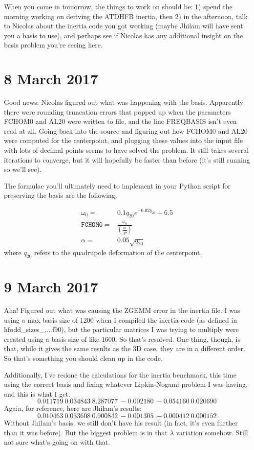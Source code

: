 \documentclass[]{report}
\begin{document}
When you come in tomorrow, the things to work on should be: 1) spend the morning working on deriving the ATDHFB inertia, then 2) in the afternoon, talk to Nicolas about the inertia code you got working (maybe Jhilam will have sent you a basis to use), and perhaps see if Nicolas has any additional insight on the basis problem you're seeing here.

\section*{8 March 2017}
Good news: Nicolas figured out what was happening with the basis. Apparently there were rounding truncation errors that popped up when the parameters FCHOM0 and AL20 were written to file, and the line FREQBASIS isn't even read at all. Going back into the source and figuring out how FCHOM0 and AL20 were computed for the centerpoint, and plugging these values into the input file with lots of decimal points seems to have solved the problem. It still takes several iterations to converge, but it will hopefully be faster than before (it's still running so we'll see).

The formulae you'll ultimately need to implement in your Python script for preserving the basis are the following:

\begin{eqnarray}
\omega_0        =& 0.1q_{20}e^{-0.02q_{20}}+6.5 \\
\mathtt{FCHOM0} =& \frac{\omega_0}{\left(\frac{41}{A^\frac{1}{3}}\right)} \\
\alpha          =& 0.05\sqrt{q_{20}}
\end{eqnarray}
\noindent where $q_{20}$ refers to the quadrupole deformation of the centerpoint.

\section*{9 March 2017}
Aha! Figured out what was causing the ZGEMM error in the inertia file. I was using a max basis size of 1200 when I compiled the inertia code (as defined in hfodd\_sizes\_....f90), but the particular matrices I was trying to multiply were created using a basis size of like 1600. So that's resolved. One thing, though, is that, while it gives the same results as the 3D case, they are in a different order. So that's something you should clean up in the code. 

Additionally, I've redone the calculations for the inertia benchmark, this time using the correct basis and fixing whatever Lipkin-Nogami problem I was having, and this is what I get:
\begin{equation}
    0.011719\    0.034843\    8.287077\   -0.002180\   -0.054160\    0.020690
\end{equation}
\noindent Again, for reference, here are Jhilam's results:
\begin{equation}
   0.010463\    0.033608\    0.000842\   -0.001305\   -0.000412\    0.000152
\end{equation}
Without Jhilam's basis, we still don't have his result (in fact, it's even further than it was before). But the biggest problem is in that $\lambda$ variation somehow. Still not sure what's going on with that.
\end{document}
